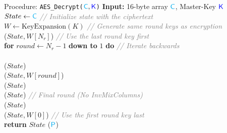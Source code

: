 \documentclass{cubeamer}
\begin{document}
\begin{frame}{Procedure: \texttt{AES\_Decrypt($\cc, \kk$)}}
    \vspace{-0.8cm}
        \small
        \textbf{Input:} 16-byte array $\textcolor{cyan}{\mathsf{C}}$, Master-Key $\kk$\\[0.4em]

        $State \gets \textcolor{cyan}{\mathsf{C}}$ \hfill \textcolor{gray}{\textit{// Initialize state with the ciphertext}} \\
        $W \gets \text{KeyExpansion}(K)$ \hfill \textcolor{gray}{\textit{// Generate same round keys as encryption}} \\[0.4em]

        ($State, W[N_r]$) \hfill \textcolor{gray}{\textit{// Use the last round key first}} \\[0.1em]

        \textbf{for} $round \gets N_r - 1$ \textbf{down to} $1$ \textbf{do} \hfill \textcolor{gray}{\textit{// Iterate backwards}} \\
        \hspace*{2em}  \\
        \hspace*{2em} ($State$) \\
        \hspace*{2em} ($State, W[round]$) \\
        \hspace*{2em} ($State$) \\ [0.1em]

        ($State$) \hfill \textcolor{gray}{\textit{// Final round (No InvMixColumns)}} \\
        ($State$) \\
        ($State, W[0]$) \hfill \textcolor{gray}{\textit{// Use the first round key last}}\\[0.4em]

        \textbf{return} $State$ ($\textcolor{cyan}{\mathsf{P}}$)
\end{frame}
\end{document}

